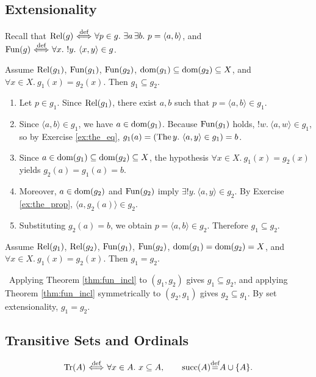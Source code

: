 \documentclass[10pt,a4paper]{article}
\begin{document}
\subsection{Extensionality}
Recall that ${\textrm{Rel}}(g) {\stackrel{{\textrm{def}}}{\ \Longleftrightarrow\ }} \forall p \in g.\ \exists a\, \exists b.\ p = \langle a,b\rangle$, and ${\textrm{Fun}}(g) {\stackrel{{\textrm{def}}}{\ \Longleftrightarrow\ }} \forall x.\ !y.\ \langle x,y\rangle \in g$.

\begin{theorem}\label{thm:fun_incl}
Assume ${\textrm{Rel}}(g_1)$, ${\textrm{Fun}}(g_1)$, ${\textrm{Fun}}(g_2)$, ${\textrm{dom}}(g_1)\subseteq{\textrm{dom}}(g_2)\subseteq X$, and $\forall x\in X.\ g_1(x)=g_2(x)$. Then $g_1\subseteq g_2$.
\end{theorem}
\myprf
\begin{enumerate}
\item Let $p \in g_1$. Since ${\textrm{Rel}}(g_1)$, there exist $a, b$ such that $p = \langle a, b\rangle \in g_1$.
\item Since $\langle a, b\rangle \in g_1$, we have $a \in {\textrm{dom}}(g_1)$. Because ${\textrm{Fun}}(g_1)$ holds, $!w.\ \langle a,w\rangle \in g_1$, so by Exercise \ref{ex:the_eq}, $g_1(a) = ({\textrm{The\,}} y.\ \langle a,y\rangle \in g_1) = b$.
\item Since $a \in {\textrm{dom}}(g_1) \subseteq {\textrm{dom}}(g_2) \subseteq X$, the hypothesis $\forall x \in X.\ g_1(x) = g_2(x)$ yields $g_2(a) = g_1(a) = b$.
\item Moreover, $a \in {\textrm{dom}}(g_2)$ and ${\textrm{Fun}}(g_2)$ imply $\exists !y.\ \langle a,y\rangle \in g_2$. By Exercise \ref{ex:the_prop}, $\langle a, g_2(a)\rangle \in g_2$.
\item Substituting $g_2(a) = b$, we obtain $p = \langle a, b\rangle \in g_2$. Therefore $g_1 \subseteq g_2$.
\end{enumerate}
\myqed

\begin{theorem}\label{thm:fun_ext}
Assume ${\textrm{Rel}}(g_1)$, ${\textrm{Rel}}(g_2)$, ${\textrm{Fun}}(g_1)$, ${\textrm{Fun}}(g_2)$, ${\textrm{dom}}(g_1) = {\textrm{dom}}(g_2) = X$, and $\forall x\in X.\ g_1(x)=g_2(x)$. Then $g_1 = g_2$.
\end{theorem}
\myprf\ Applying Theorem \ref{thm:fun_incl} to $(g_1, g_2)$ gives $g_1 \subseteq g_2$, and applying Theorem \ref{thm:fun_incl} symmetrically to $(g_2, g_1)$ gives $g_2 \subseteq g_1$. By set extensionality, $g_1 = g_2$. \myqed
\subsection{Transitive Sets and Ordinals}
\begin{definition}
$$\Tr(A) \propdef \forall x\in A.\ x\subseteq A, \qquad \mysucc(A) \eqdef A \cup \{A\}.$$
\end{definition}
\end{document}
